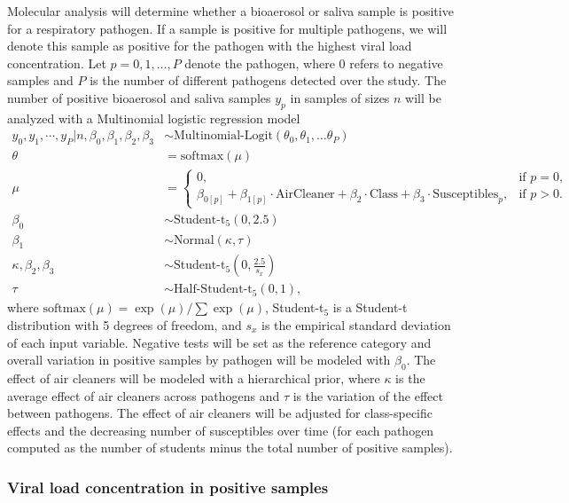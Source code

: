 \documentclass{article}
\begin{document}
Molecular analysis will determine whether a bioaerosol or saliva sample is positive for a respiratory pathogen. If a sample is positive for multiple pathogens, we will denote this sample as positive for the pathogen with the highest viral load concentration. Let $p = 0, 1, \dots, P$ denote the pathogen, where $0$ refers to negative samples and $P$ is the number of different pathogens detected over the study. The number of positive bioaerosol and saliva samples $y_p$ in samples of sizes $n$ will be analyzed with a Multinomial logistic regression model
\begin{align*}
    y_0, y_1, \cdots, y_P | n, \beta_0, \beta_1, \beta_2, \beta_3 &\sim \text{Multinomial-Logit}(\theta_0, \theta_1, \dots \theta_P) \\
    \theta &= \text{softmax}(\mu) \\
    \mu &= \begin{cases}
                0, & \text{if } p=0, \\
                \beta_{0[p]} + \beta_{1[p]} \cdot \text{AirCleaner} + \beta_2 \cdot \text{Class} + \beta_3 \cdot \text{Susceptibles}_p, & \text{if } p>0.
            \end{cases} \\
    \beta_0 &\sim \text{Student-t}_5(0, 2.5) \\
    \beta_1 &\sim \text{Normal}(\kappa, \tau) \\
    \kappa, \beta_2, \beta_3 &\sim \text{Student-t}_5\left(0, \frac{2.5}{s_{x}}\right) \\
    \tau &\sim \text{Half-Student-t}_5(0,1),
\end{align*}
where $\text{softmax}(\mu) = \exp(\mu)/\sum\exp(\mu)$, Student-t$_5$ is a Student-t distribution with 5 degrees of freedom, and $s_{x}$ is the empirical standard deviation of each input variable.  Negative tests will be set as the reference category and overall variation in positive samples by pathogen will be modeled with $\beta_0$. The effect of air cleaners will be modeled with a hierarchical prior, where $\kappa$ is the average effect of air cleaners across pathogens and $\tau$ is the variation of the effect between pathogens. The effect of air cleaners will be adjusted for class-specific effects and the decreasing number of susceptibles over time (for each pathogen computed as the number of students minus the total number of positive samples). 

\subsubsection{Viral load concentration in positive samples}\label{subsubsec:viral_load}
\end{document}
